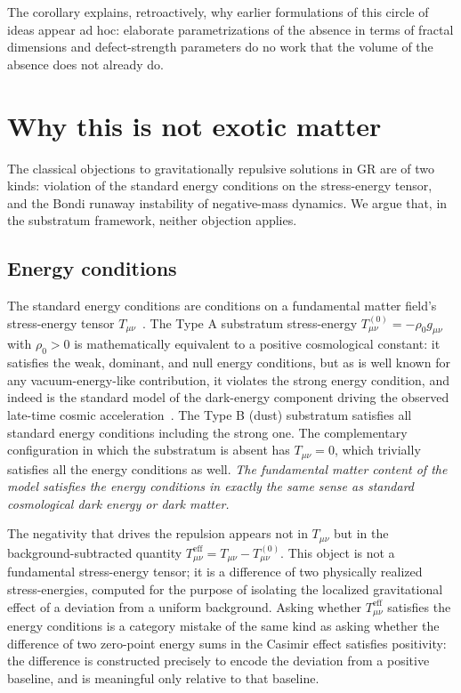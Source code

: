 \documentclass[%
  reprint,
  superscriptaddress,
  showpacs,
  showkeys,
  amsmath,amssymb,
  pra,
  longbibliography,
  floatfix,
  x11names
]{revtex4-2}
\begin{document}
The corollary explains, retroactively, why earlier formulations of this circle of ideas appear ad hoc: elaborate parametrizations of the absence in terms of fractal dimensions and defect-strength parameters do no work that the volume of the absence does not already do.

\section{Why this is not exotic matter}
\label{sec:exotic}

The classical objections to gravitationally repulsive solutions in GR are of two kinds: violation of the standard energy conditions on the stress-energy tensor, and the Bondi runaway instability of negative-mass dynamics. We argue that, in the substratum framework, neither objection applies.

\subsection{Energy conditions}

The standard energy conditions are conditions on a fundamental matter field's stress-energy tensor $T_{\mu\nu}$~\cite{hawking-ellis,wald-1984,kontou-2020}. The Type A substratum stress-energy $T^{(0)}_{\mu\nu} = -\rho_0 g_{\mu\nu}$ with $\rho_0 > 0$ is mathematically equivalent to a positive cosmological constant: it satisfies the weak, dominant, and null energy conditions, but as is well known for any vacuum-energy-like contribution, it violates the strong energy condition, and indeed is the standard model of the dark-energy component driving the observed late-time cosmic acceleration~\cite{Riess1998,Perlmutter1999}. The Type B (dust) substratum satisfies all standard energy conditions including the strong one. The complementary configuration in which the substratum is absent has $T_{\mu\nu} = 0$, which trivially satisfies all the energy conditions as well. \emph{The fundamental matter content of the model satisfies the energy conditions in exactly the same sense as standard cosmological dark energy or dark matter.}

The negativity that drives the repulsion appears not in $T_{\mu\nu}$ but in the background-subtracted quantity $T^{\mathrm{eff}}_{\mu\nu} = T_{\mu\nu} - T^{(0)}_{\mu\nu}$. This object is not a fundamental stress-energy tensor; it is a difference of two physically realized stress-energies, computed for the purpose of isolating the localized gravitational effect of a deviation from a uniform background. Asking whether $T^{\mathrm{eff}}_{\mu\nu}$ satisfies the energy conditions is a category mistake of the same kind as asking whether the difference of two zero-point energy sums in the Casimir effect satisfies positivity: the difference is constructed precisely to encode the deviation from a positive baseline, and is meaningful only relative to that baseline.
\end{document}
